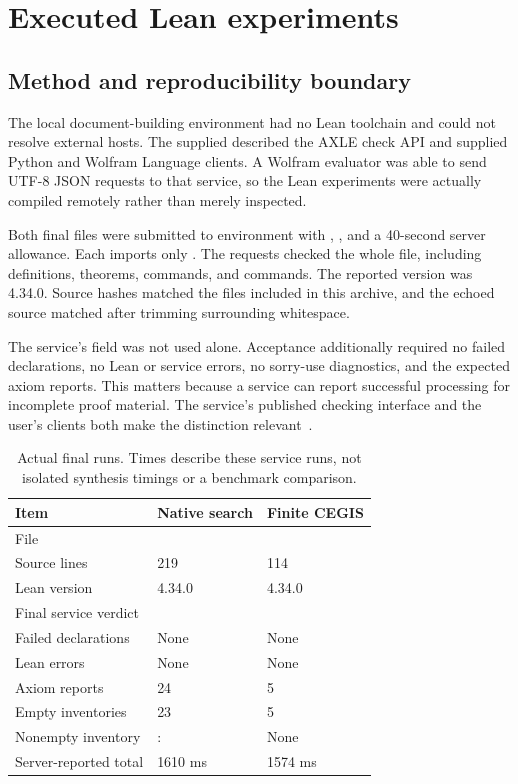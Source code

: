 \section{Executed Lean experiments}
\label{sec:experiments}

\subsection{Method and reproducibility boundary}

The local document-building environment had no Lean toolchain and could not resolve external hosts. The supplied  described the AXLE check API and supplied Python and Wolfram Language clients. A Wolfram evaluator was able to send UTF-8 JSON requests to that service, so the Lean experiments were actually compiled remotely rather than merely inspected.

Both final files were submitted to environment  with , , and a 40-second server allowance. Each imports only . The requests checked the whole file, including definitions, theorems,  commands, and  commands. The reported version was 4.34.0. Source hashes matched the files included in this archive, and the echoed source matched after trimming surrounding whitespace.

The service's  field was not used alone. Acceptance additionally required no failed declarations, no Lean or service errors, no sorry-use diagnostics, and the expected axiom reports. This matters because a service can report successful processing for incomplete proof material. The service's published checking interface and the user's clients both make the distinction relevant~\cite{axle}.

\begin{table}[ht]
\centering\small
\begin{tabularx}{\textwidth}{@{}L{0.28\textwidth}YY@{}}
\toprule
Item & Native search & Finite CEGIS \\
\midrule
File &  &  \\
Source lines & 219 & 114 \\
Lean version & 4.34.0 & 4.34.0 \\
Final service verdict &  &  \\
Failed declarations & None & None \\
Lean errors & None & None \\
Axiom reports & 24 & 5 \\
Empty inventories & 23 & 5 \\
Nonempty inventory & :  & None \\
Server-reported total & 1610 ms & 1574 ms \\
\bottomrule
\end{tabularx}
\caption{Actual final runs. Times describe these service runs, not isolated synthesis timings or a benchmark comparison.}
\end{table}

